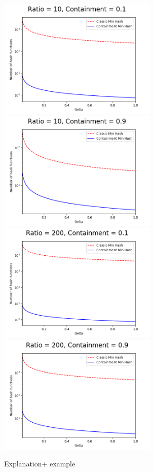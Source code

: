 \documentclass[11pt]{amsart}
\theoremstyle{remark}
\numberwithin{equation}{section}
\begin{document}
\begin{figure}[!h]%
\begin{center}
\includegraphics[width=3.0in,trim={0 0 0 0in},clip]{Figs/1010.png}%
\hspace{1ex}
\includegraphics[width=3.0in,trim={0 0 0 0in},clip]{Figs/1090.png}\\
\includegraphics[width=3.0in,trim={0 0 0 0in},clip]{Figs/20010.png}%
\hspace{1ex}
\includegraphics[width=3.0in,trim={0 0 0 0in},clip]{Figs/20090.png}
\end{center}
\caption{Explanation+ example }
\label{fig:DeltaK}%
\end{figure}
\end{document}
